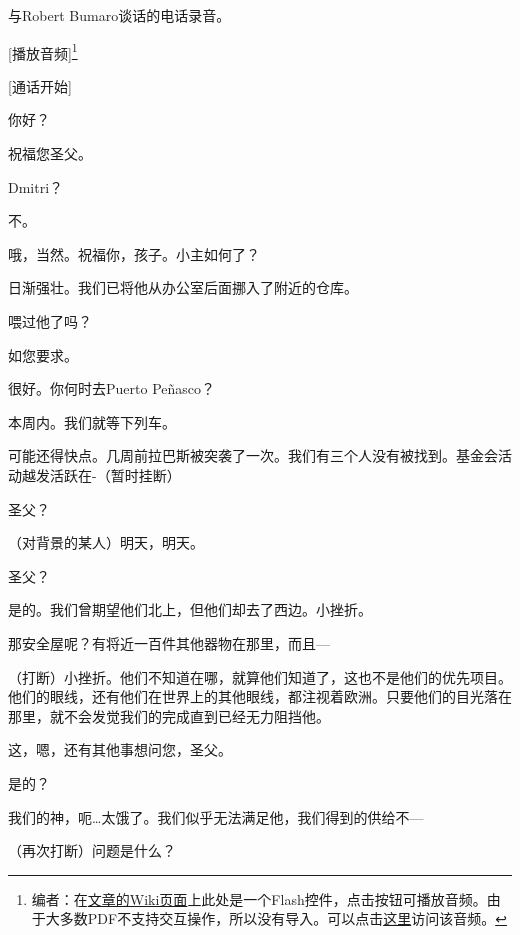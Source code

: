 与Robert Bumaro谈话的电话录音。 \\

[播放音频]\footnote{
编者\QIS：在\href{http://scp-wiki-cn.wikidot.com/twistedgears-kaktus-proposal}{文章的Wiki页面}上此处是一个Flash控件，点击按钮可播放音频。由于大多数PDF不支持交互操作，所以没有导入。可以点击\href{http://scp-wiki.wdfiles.com/local--files/twistedgears-kaktus-proposal/bumaro.mp3}{这里}访问该音频。
}

\begin{scpbox}

[通话开始]

你好？

祝福您圣父。

Dmitri？

不。

哦，当然。祝福你，孩子。小主如何了？

日渐强壮。我们已将他从办公室后面挪入了附近的仓库。

喂过他了吗？

如您要求。

很好。你何时去Puerto Peñasco？

本周内。我们就等下列车。

可能还得快点。几周前拉巴斯被突袭了一次。我们有三个人没有被找到。基金会活动越发活跃在-（暂时挂断）

圣父？

（对背景的某人）明天，明天。

圣父？

是的。我们曾期望他们北上，但他们却去了西边。小挫折。

那安全屋呢？有将近一百件其他器物在那里，而且—

（打断）小挫折。他们不知道在哪，就算他们知道了，这也不是他们的优先项目。他们的眼线，还有他们在世界上的其他眼线，都注视着欧洲。只要他们的目光落在那里，就不会发觉我们的完成直到已经无力阻挡他。

这，嗯，还有其他事想问您，圣父。

是的？

我们的神，呃…太饿了。我们似乎无法满足他，我们得到的供给不—

（再次打断）问题是什么？


\end{scpbox}
